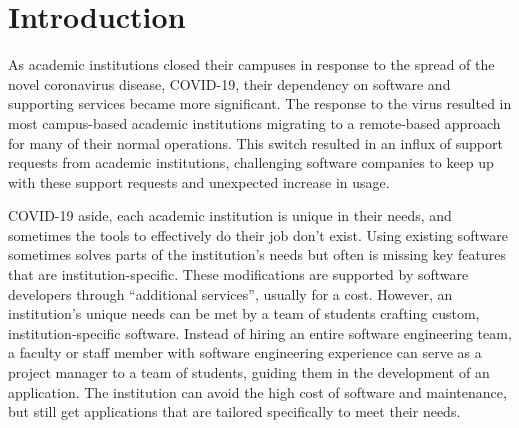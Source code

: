 \section{Introduction}


As academic institutions closed their campuses in response to the spread of the novel coronavirus disease, COVID-19, their dependency on software and supporting services became more significant. The response to the virus resulted in most campus-based academic institutions migrating to a remote-based approach for many of their normal operations. This switch resulted in an influx of support requests from academic institutions, challenging software companies to keep up with these support requests and unexpected increase in usage.

COVID-19 aside, each academic institution is unique in their needs, and sometimes the tools to effectively do their job don't exist. Using existing software sometimes solves parts of the institution's needs but often is missing key features that are institution-specific. These modifications are supported by software developers through ``additional services”, usually for a cost. However, an institution's unique needs can be met by a team of students crafting custom, institution-specific software. Instead of hiring an entire software engineering team, a faculty or staff member with software engineering experience can serve as a project manager to a team of students, guiding them in the development of an application. The institution can avoid the high cost of software and maintenance, but still get applications that are tailored specifically to meet their needs.

